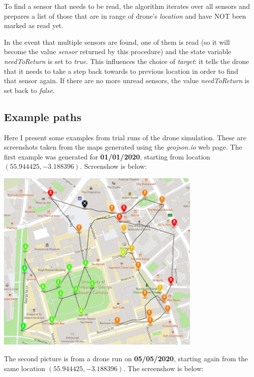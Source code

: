 \documentclass{article}
\begin{document}
To find a sensor that needs to be read, the algorithm iterates over all sensors and prepares a list of those that are in range of drone's \textit{location} and have NOT been marked as read yet.

In the event that multiple sensors are found, one of them is read (so it will become the value \textit{sensor} returned by this procedure) and the state variable \textit{needToReturn} is set to \textit{true}. This influences the choice of \textit{target}: it tells the drone that it needs to take a step back towards to previous location in order to find that sensor again. If there are no more unread sensors, the value \textit{needToReturn} is set back to \textit{false}.

\subsection{Example paths}

Here I present some examples from trial runs of the drone simulation. These are screenshots taken from the maps generated using the \textit{geojson.io} web page. The first example was generated for \textbf{01/01/2020}, starting from location $(55.944425, -3.188396)$. Screenshow is below:

\begin{center}
\includegraphics[width=0.75\textwidth]{01-01-2020}
\end{center}

The second picture is from a drone run on \textbf{05/05/2020}, starting again from the same location $(55.944425, -3.188396)$. The screenshow is below:
\end{document}
